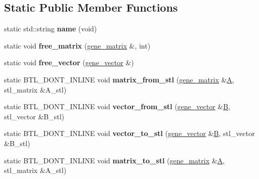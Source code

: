 \subsection*{Static Public Member Functions}
\begin{DoxyCompactItemize}
\item 
\mbox{\label{classtensor__interface_a67ec853299d1e51e8de5792f29662d58}} 
static std\+::string {\bfseries name} (void)
\item 
\mbox{\label{classtensor__interface_acc4dd965c5eeba5461654fe375627b06}} 
static void {\bfseries free\+\_\+matrix} (\hyperlink{class_eigen_1_1_tensor}{gene\+\_\+matrix} \&, int)
\item 
\mbox{\label{classtensor__interface_a3b3eb0836a787c1efa320ad88d11a7f1}} 
static void {\bfseries free\+\_\+vector} (\hyperlink{class_eigen_1_1_tensor}{gene\+\_\+vector} \&)
\item 
\mbox{\label{classtensor__interface_ae8b9ffe5345b1a8bed0d7ad9e6aa6590}} 
static B\+T\+L\+\_\+\+D\+O\+N\+T\+\_\+\+I\+N\+L\+I\+NE void {\bfseries matrix\+\_\+from\+\_\+stl} (\hyperlink{class_eigen_1_1_tensor}{gene\+\_\+matrix} \&\hyperlink{group___core___module_class_eigen_1_1_matrix}{A}, stl\+\_\+matrix \&A\+\_\+stl)
\item 
\mbox{\label{classtensor__interface_a1c684ab8c12594170aa1ae75468cb9bc}} 
static B\+T\+L\+\_\+\+D\+O\+N\+T\+\_\+\+I\+N\+L\+I\+NE void {\bfseries vector\+\_\+from\+\_\+stl} (\hyperlink{class_eigen_1_1_tensor}{gene\+\_\+vector} \&\hyperlink{group___core___module_class_eigen_1_1_matrix}{B}, stl\+\_\+vector \&B\+\_\+stl)
\item 
\mbox{\label{classtensor__interface_a7a0253893f96e390d00e9e37c05ace13}} 
static B\+T\+L\+\_\+\+D\+O\+N\+T\+\_\+\+I\+N\+L\+I\+NE void {\bfseries vector\+\_\+to\+\_\+stl} (\hyperlink{class_eigen_1_1_tensor}{gene\+\_\+vector} \&\hyperlink{group___core___module_class_eigen_1_1_matrix}{B}, stl\+\_\+vector \&B\+\_\+stl)
\item 
\mbox{\label{classtensor__interface_a70c7fd98c15c2157ea7ff6aefee99ca5}} 
static B\+T\+L\+\_\+\+D\+O\+N\+T\+\_\+\+I\+N\+L\+I\+NE void {\bfseries matrix\+\_\+to\+\_\+stl} (\hyperlink{class_eigen_1_1_tensor}{gene\+\_\+matrix} \&\hyperlink{group___core___module_class_eigen_1_1_matrix}{A}, stl\+\_\+matrix \&A\+\_\+stl)

\end{DoxyCompactItemize}
